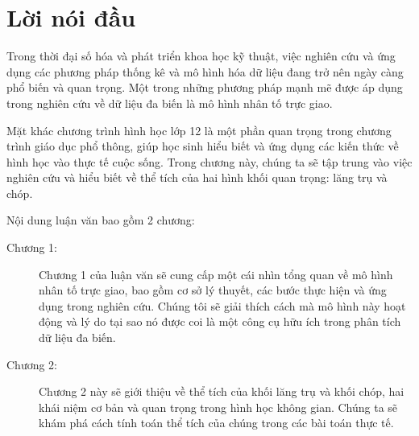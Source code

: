 \chapter*{Lời nói đầu}

Trong thời đại số hóa và phát triển khoa học kỹ thuật, việc nghiên cứu và ứng dụng các phương pháp thống kê và mô hình hóa dữ liệu đang trở nên ngày càng phổ biến và quan trọng. Một trong những phương pháp mạnh mẽ được áp dụng trong nghiên cứu về dữ liệu đa biến là mô hình nhân tố trực giao.

Mặt khác chương trình hình học lớp 12 là một phần quan trọng trong chương trình giáo dục phổ thông, giúp học sinh hiểu biết và ứng dụng các kiến thức về hình học vào thực tế cuộc sống. Trong chương này, chúng ta sẽ tập trung vào việc nghiên cứu và hiểu biết về thể tích của hai hình khối quan trọng: lăng trụ và chóp.

Nội dung luận văn bao gồm 2 chương:

\begin{description}
\item [Chương 1:] Chương 1 của luận văn sẽ cung cấp một cái nhìn tổng quan về mô hình nhân tố trực giao, bao gồm cơ sở lý thuyết, các bước thực hiện và ứng dụng trong nghiên cứu. Chúng tôi sẽ giải thích cách mà mô hình này hoạt động và lý do tại sao nó được coi là một công cụ hữu ích trong phân tích dữ liệu đa biến.
\item [Chương 2:] 
Chương 2 này sẽ giới thiệu về thể tích của khối lăng trụ và khối chóp, hai khái niệm cơ bản và quan trọng trong hình học không gian. Chúng ta sẽ khám phá cách tính toán thể tích của chúng trong các bài toán thực tế.
\end{description}

